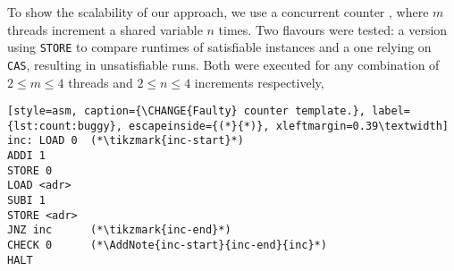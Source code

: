 To show the scalability of our approach, we  use a  concurrent counter , where $m$ threads increment a shared variable $n$ times.
Two flavours were tested: a  version using \lstinline[style=asm]{STORE} to compare runtimes of satisfiable instances and a  one relying on \lstinline[style=asm]{CAS}, resulting in unsatisfiable runs.
Both were executed for any combination of $2 \leq m \leq 4$ threads and $2 \leq n \leq 4$ increments respectively,

\begin{lstlisting}[style=asm, caption={\CHANGE{Faulty} counter template.}, label={lst:count:buggy}, escapeinside={(*}{*)}, xleftmargin=0.39\textwidth]
inc: LOAD 0  (*\tikzmark{inc-start}*)
ADDI 1
STORE 0
LOAD <adr>
SUBI 1
STORE <adr>
JNZ inc      (*\tikzmark{inc-end}*)
CHECK 0      (*\AddNote{inc-start}{inc-end}{inc}*)
HALT
\end{lstlisting}

